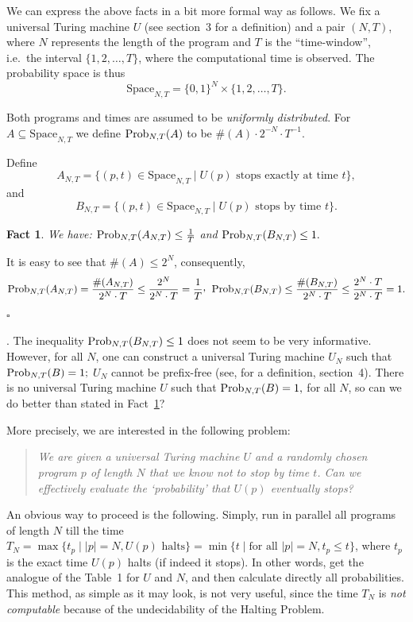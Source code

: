 \documentclass[12pt,twoside,openright]{report}
\newcommand{\QED}{\hfill $\square$}
\newcommand{\Prob}{{\rm Prob}}
\newtheorem{fact}[thm]{Fact}
\newcommand{\myproof}{\noindent {\em Proof.}  }
\newcommand{\Space}{\mbox{Space}}
\begin{document}
We can express the above facts in a bit more formal way as follows.  We fix a universal Turing machine $U$ (see section~3 for a definition) 
and a pair $(N,T)$, where $N$ represents the length of the program and $T$ is the ``time-window'', i.e.\ the interval $\{1,2,\ldots ,T\}$, where the computational time is observed.  The probability space is thus \[\Space_{N,T} = \{0, 1\}^{N} \times \{1,2,\ldots ,T\}.\]

Both programs and times are assumed to be {\it uniformly distributed}. For $A \subseteq \Space_{N,T}$ we define  $\Prob_{N,T}(A)$ to be $\#(A)\cdot 2^{-N} \cdot T^{-1}$.

\medskip


Define
\[A_{N,T} = \{(p,t)\in \Space_{N,T}  \mid U(p) \mbox{ stops exactly at time $t$}\},\]
\noindent and
\[B_{N,T} = \{(p,t)\in \Space_{N,T}  \mid U(p) \mbox{ stops  by time $t$}\}.\]




\medskip

\begin{fact}
\label{prel}  We have: $\Prob_{N,T}(A_{N,T})  \le  \frac{1}{T}$ and  $\Prob_{N,T}(B_{N,T}) \le  1.$ 
\end{fact}

\myproof It is easy to see that $\# (A) \le 2^{N}$, consequently,
$$\Prob_{N,T}(A_{N,T}) = \frac{\#(A_{N,T})}{2^{N} \cdot T} \le \frac{2^{N}}{2^{N} \cdot T} = \frac{1}{T}\raisebox{0.4ex}{,} \phantom{x} \Prob_{N,T}(B_{N,T}) \le \frac{\#(B_{N,T})}{2^{N} \cdot T}\le  \frac{2^{N} \cdot T}{2^{N} \cdot T} = 1.$$   \QED

\medskip

. The inequality  $\Prob_{N,T}(B_{N,T}) \le  1$ does not seem to be very informative. However, for all $N$, one can construct a universal Turing machine $U_N$ such that $\Prob_{N,T}(B) = 1;$  $U_{N}$ cannot be prefix-free (see, for a definition,  section~4).  There is no universal Turing machine  $U$ such that $\Prob_{N,T}(B) = 1, $ for all $N$, so  can we do better than stated in Fact~\ref{prel}?


More precisely, we are interested in the following problem: 
\begin{quote} \it We are given a universal Turing machine $U$ and a randomly chosen program $p$ of length $N$ that we know  not to stop by time $t$. Can we effectively evaluate the `probability' that $U(p)$ eventually stops? 
\end{quote}

An obvious way to proceed is the following. Simply, run in parallel all programs of length $N$ till the time  $T_{N} = \max\{t_{p} \mid  |p|=N, U(p) \mbox{  halts} \} = \min\{t\mid \mbox{for all } |p|=N, t_{p} \le t\}$, where $t_{p} $ is the exact time $U(p)$ halts (if indeed it stops). In other words, get the analogue of the Table~1 for $U$ and $N$, and then calculate directly all probabilities. This method, as simple as it may look, is not very useful, since the time $T_{N}$ is {\it not computable}   because of the undecidability of the Halting Problem.
\end{document}
